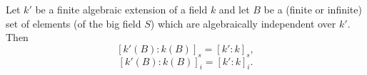 Let $k'$ be a finite algebraic extension of a field $k$ and let $B$ be a (finite or infinite) set of elements (of the big field $S$) which are algebraically independent over $k'$. Then
$$[k'(B):k(B)]_s = [k':k]_s,$$
$$[k'(B):k(B)]_i = [k':k]_i.$$
